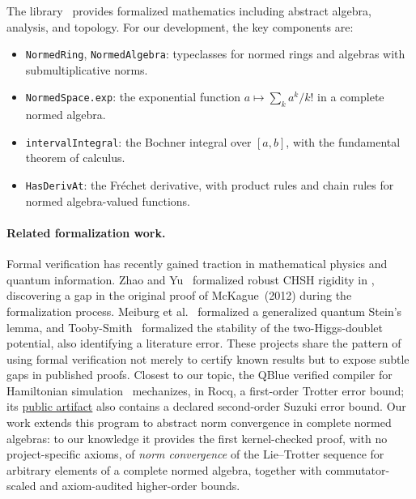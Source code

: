The \Mathlib library~\cite{mathlib2020} provides formalized mathematics
including abstract algebra, analysis, and topology. For our development,
the key components are:
\begin{itemize}
  \item \texttt{NormedRing}, \texttt{NormedAlgebra}: typeclasses for
    normed rings and algebras with submultiplicative norms.
  \item \texttt{NormedSpace.exp}: the exponential function
    $a \mapsto \sum_{k} a^k/k!$ in a complete normed algebra.
  \item \texttt{intervalIntegral}: the Bochner integral over $[a,b]$,
    with the fundamental theorem of calculus.
  \item \texttt{HasDerivAt}: the Fr\'{e}chet derivative, with product rules
    and chain rules for normed algebra-valued functions.
\end{itemize}

\paragraph{Related formalization work.}
Formal verification has recently gained traction in mathematical physics and
quantum information.
Zhao and Yu~\cite{zhao2025chsh} formalized robust CHSH rigidity in \Lean,
discovering a gap in the original proof of McKague~(2012) during the
formalization process.
Meiburg et al.~\cite{meiburg2025steinlemma} formalized a generalized
quantum Stein's lemma, and
Tooby-Smith~\cite{toobysmith2026higgs} formalized the stability of the
two-Higgs-doublet potential, also identifying a literature error.
These projects share the pattern of using formal verification not merely to
certify known results but to expose subtle gaps in published proofs.
Closest to our topic, the QBlue verified compiler for Hamiltonian
simulation~\cite{liVerifiedCompilerQuantum2025} mechanizes, in Rocq, a
first-order Trotter error bound; its
\href{https://doi.org/10.5281/zenodo.15852130}{public artifact} also contains
a declared second-order Suzuki error bound. Our work extends this program to
abstract norm convergence in complete normed algebras: to our knowledge it
provides the first kernel-checked proof, with no project-specific axioms, of
\emph{norm convergence} of the Lie--Trotter sequence for arbitrary elements
of a complete normed algebra, together with commutator-scaled and
axiom-audited higher-order bounds.
